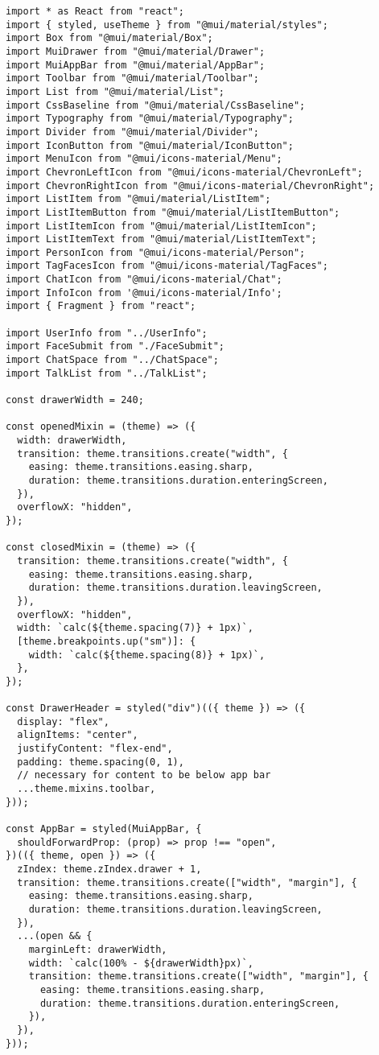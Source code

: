 \begin{verbatim}
import * as React from "react";
import { styled, useTheme } from "@mui/material/styles";
import Box from "@mui/material/Box";
import MuiDrawer from "@mui/material/Drawer";
import MuiAppBar from "@mui/material/AppBar";
import Toolbar from "@mui/material/Toolbar";
import List from "@mui/material/List";
import CssBaseline from "@mui/material/CssBaseline";
import Typography from "@mui/material/Typography";
import Divider from "@mui/material/Divider";
import IconButton from "@mui/material/IconButton";
import MenuIcon from "@mui/icons-material/Menu";
import ChevronLeftIcon from "@mui/icons-material/ChevronLeft";
import ChevronRightIcon from "@mui/icons-material/ChevronRight";
import ListItem from "@mui/material/ListItem";
import ListItemButton from "@mui/material/ListItemButton";
import ListItemIcon from "@mui/material/ListItemIcon";
import ListItemText from "@mui/material/ListItemText";
import PersonIcon from "@mui/icons-material/Person";
import TagFacesIcon from "@mui/icons-material/TagFaces";
import ChatIcon from "@mui/icons-material/Chat";
import InfoIcon from '@mui/icons-material/Info';
import { Fragment } from "react";

import UserInfo from "../UserInfo";
import FaceSubmit from "./FaceSubmit";
import ChatSpace from "../ChatSpace";
import TalkList from "../TalkList";

const drawerWidth = 240;

const openedMixin = (theme) => ({
  width: drawerWidth,
  transition: theme.transitions.create("width", {
    easing: theme.transitions.easing.sharp,
    duration: theme.transitions.duration.enteringScreen,
  }),
  overflowX: "hidden",
});

const closedMixin = (theme) => ({
  transition: theme.transitions.create("width", {
    easing: theme.transitions.easing.sharp,
    duration: theme.transitions.duration.leavingScreen,
  }),
  overflowX: "hidden",
  width: `calc(${theme.spacing(7)} + 1px)`,
  [theme.breakpoints.up("sm")]: {
    width: `calc(${theme.spacing(8)} + 1px)`,
  },
});

const DrawerHeader = styled("div")(({ theme }) => ({
  display: "flex",
  alignItems: "center",
  justifyContent: "flex-end",
  padding: theme.spacing(0, 1),
  // necessary for content to be below app bar
  ...theme.mixins.toolbar,
}));

const AppBar = styled(MuiAppBar, {
  shouldForwardProp: (prop) => prop !== "open",
})(({ theme, open }) => ({
  zIndex: theme.zIndex.drawer + 1,
  transition: theme.transitions.create(["width", "margin"], {
    easing: theme.transitions.easing.sharp,
    duration: theme.transitions.duration.leavingScreen,
  }),
  ...(open && {
    marginLeft: drawerWidth,
    width: `calc(100% - ${drawerWidth}px)`,
    transition: theme.transitions.create(["width", "margin"], {
      easing: theme.transitions.easing.sharp,
      duration: theme.transitions.duration.enteringScreen,
    }),
  }),
}));


\end{verbatim}
